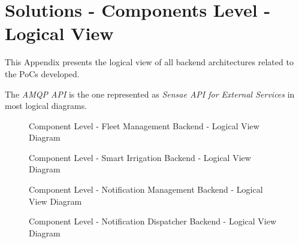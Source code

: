 \chapter{Solutions - Components Level - Logical View}
\label{AppendixC2}

This Appendix presents the logical view of all backend architectures related to the \gls{PoC}s developed.

The \textit{AMQP API} is the one represented as \textit{Sensae API for External Services} in most logical diagrams.

\begin{figure}[H]
   \centering
   \resizebox{0.75\columnwidth}{!}
   {
      
   }
   \caption[Component Level - Fleet Management Backend - Logical View Diagram]{Component Level - Fleet Management Backend - Logical View Diagram}
   \label{fig:AppendixC2:fleet}
\end{figure}

\begin{figure}[H]
   \centering
   \resizebox{0.75\columnwidth}{!}
   {
      
   }
   \caption[Component Level - Smart Irrigation Backend - Logical View Diagram]{Component Level - Smart Irrigation Backend - Logical View Diagram}
   \label{fig:AppendixC2:irrig}
\end{figure}

\begin{figure}[H]
   \centering
   \resizebox{0.75\columnwidth}{!}
   {
      
   }
   \caption[Component Level - Notification Management Backend - Logical View Diagram]{Component Level - Notification Management Backend - Logical View Diagram}
   \label{fig:AppendixC2:notidispatcher}
\end{figure}

\begin{figure}[H]
   \centering
   \resizebox{0.75\columnwidth}{!}
   {
      
   }
   \caption[Component Level - Notification Dispatcher Backend - Logical View Diagram]{Component Level - Notification Dispatcher Backend - Logical View Diagram}
   \label{fig:AppendixC2:notidispatcher}
\end{figure}
